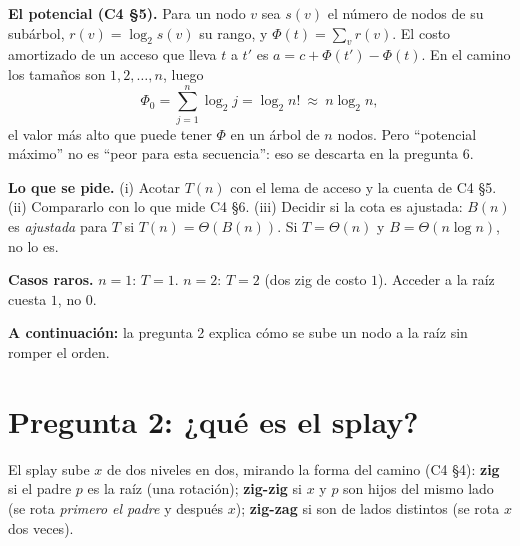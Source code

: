 \documentclass[11pt]{article}
\begin{document}
\textbf{El potencial (C4 §5).} Para un nodo $v$ sea $s(v)$ el número de nodos de su subárbol, $r(v)=\log_2s(v)$ su
rango, y $\Phi(t)=\sum_vr(v)$. El costo amortizado de un acceso que lleva $t$ a $t'$ es $a=c+\Phi(t')-\Phi(t)$.
En el camino los tamaños son $1,2,\dots,n$, luego
\[
\Phi_0=\sum_{j=1}^{n}\log_2 j=\log_2 n!\ \approx\ n\log_2 n,
\]
el valor más alto que puede tener $\Phi$ en un árbol de $n$ nodos. Pero ``potencial máximo'' no es ``peor para
esta secuencia'': eso se descarta en la pregunta 6.

\textbf{Lo que se pide.} (i) Acotar $T(n)$ con el lema de acceso y la cuenta de C4 §5. (ii) Compararlo con lo que
mide C4 §6. (iii) Decidir si la cota es ajustada: $B(n)$ es \emph{ajustada} para $T$ si $T(n)=\Theta(B(n))$. Si
$T=\Theta(n)$ y $B=\Theta(n\log n)$, no lo es.

\textbf{Casos raros.} $n=1$: $T=1$. $n=2$: $T=2$ (dos zig de costo $1$). Acceder a la raíz cuesta $1$, no $0$.

\textbf{A continuación:} la pregunta 2 explica cómo se sube un nodo a la raíz sin romper el orden.

\section{Pregunta 2: ¿qué es el splay?}

El splay sube $x$ de dos niveles en dos, mirando la forma del camino (C4 §4): \textbf{zig} si el padre $p$ es la
raíz (una rotación); \textbf{zig-zig} si $x$ y $p$ son hijos del mismo lado (se rota \emph{primero el padre}
y después $x$); \textbf{zig-zag} si son de lados distintos (se rota $x$ dos veces).
\end{document}
